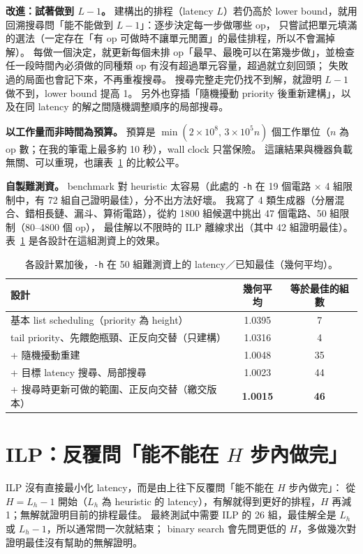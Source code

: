 \documentclass[12pt,a4paper]{article}
\begin{document}
\textbf{改進：試著做到 $L-1$。}
建構出的排程（latency $L$）若仍高於 lower bound，就用回溯搜尋問「能不能做到 $L-1$」：逐步決定每一步做哪些 op，
只嘗試把單元填滿的選法（一定存在「有 op 可做時不讓單元閒置」的最佳排程，所以不會漏掉解）。
每做一個決定，就更新每個未排 op「最早、最晚可以在第幾步做」，並檢查任一段時間內必須做的同種類 op 有沒有超過單元容量，超過就立刻回頭；
失敗過的局面也會記下來，不再重複搜尋。
搜尋完整走完仍找不到解，就證明 $L-1$ 做不到，lower bound 提高 1。
另外也穿插「隨機擾動 priority 後重新建構」，以及在同 latency 的解之間隨機調整順序的局部搜尋。

\textbf{以工作量而非時間為預算。}
預算是 $\min(2\times10^8,\,3\times10^5 n)$ 個工作單位（$n$ 為 op 數；在我的筆電上最多約 10 秒），wall clock 只當保險。
這讓結果與機器負載無關、可以重現，也讓表~\ref{tab:ablation} 的比較公平。

\textbf{自製難測資。}
benchmark 對 heuristic 太容易（此處的 \texttt{-h} 在 19 個電路 × 4 組限制中，有 72 組自己證明最佳），分不出方法好壞。
我寫了 4 類生成器（分層混合、錯相長鏈、漏斗、算術電路），從約 1800 組候選中挑出 47 個電路、50 組限制（80--4800 個 op），
最佳解以不限時的 ILP 離線求出（其中 42 組證明最佳）。表~\ref{tab:ablation} 是各設計在這組測資上的效果。

\begin{table}[h]
\centering\small
\caption{各設計累加後，\texttt{-h} 在 50 組難測資上的 latency／已知最佳（幾何平均）。}
\label{tab:ablation}
\begin{tabular}{lcc}
\toprule
設計 & 幾何平均 & 等於最佳的組數 \\
\midrule
基本 list scheduling（priority 為 height） & 1.0395 & 7 \\
tail priority、先餵飽瓶頸、正反向交替（只建構） & 1.0316 & 4 \\
\quad + 隨機擾動重建 & 1.0048 & 35 \\
\quad + 目標 latency 搜尋、局部搜尋 & 1.0023 & 44 \\
\quad + 搜尋時更新可做的範圍、正反向交替（繳交版本） & \textbf{1.0015} & \textbf{46} \\
\bottomrule
\end{tabular}
\end{table}

\section{ILP：反覆問「能不能在 $H$ 步內做完」}

ILP 沒有直接最小化 latency，而是由上往下反覆問「能不能在 $H$ 步內做完」：
從 $H = L_h - 1$ 開始（$L_h$ 為 heuristic 的 latency），有解就得到更好的排程，$H$ 再減 1；無解就證明目前的排程最佳。
最終測試中需要 ILP 的 26 組，最佳解全是 $L_h$ 或 $L_h-1$，所以通常問一次就結束；
binary search 會先問更低的 $H$，多做幾次對證明最佳沒有幫助的無解證明。
\end{document}
